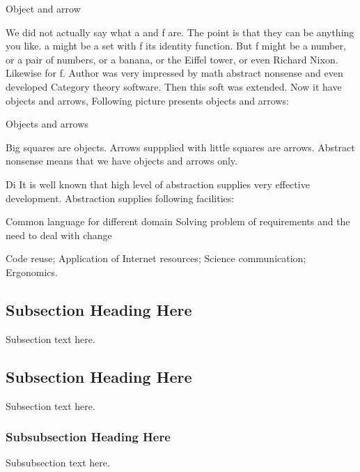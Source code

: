 \documentclass[10pt,journal,compsoc]{IEEEtran}
\begin{document}
	Object and arrow
	
	We did not actually say what a and f are. The point is that they can be anything you like. a might be a set with f its identity function. But f might be a number, or a pair of numbers, or a banana, or the Eiffel tower, or even Richard Nixon. Likewise for f. Author was very impressed by math abstract nonsense and even developed Category theory software. Then this soft was extended. Now it have objects and arrows, Following picture presents objects and arrows:
	
	Objects and arrows
	
	Big squares are objects. Arrows suppplied with little squares are arrows. Abstract nonsense means that we have objects and arrows only.
	
	Di
	It is well known that high level of abstraction supplies very effective development. Abstraction supplies following facilities:
	
	Common language for different domain
	Solving problem of requirements and the need to deal with change
	
	Code reuse;
	Application of Internet resources;
	Science communication;
	Ergonomics.
	\subsection{Subsection Heading Here}
	Subsection text here.
	
	
	
	\subsection{Subsection Heading Here}
	Subsection text here.
	
	
	\subsubsection{Subsubsection Heading Here}
	Subsubsection text here.
	
\end{document}

